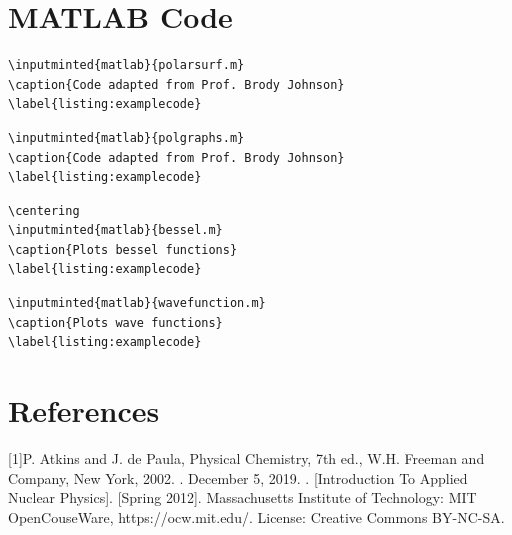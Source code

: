 \documentclass{article}
\begin{document}
\section{MATLAB Code}
\begin{lstlisting}[h]
\inputminted{matlab}{polarsurf.m}
\caption{Code adapted from Prof. Brody Johnson}
\label{listing:examplecode}
\end{lstlisting}

\begin{lstlisting}[h]
\inputminted{matlab}{polgraphs.m}
\caption{Code adapted from Prof. Brody Johnson}
\label{listing:examplecode}
\end{lstlisting}

\begin{lstlisting}[frame=sing]
\centering
\inputminted{matlab}{bessel.m}
\caption{Plots bessel functions}
\label{listing:examplecode}
\end{lstlisting}

\begin{lstlisting}[h]
\inputminted{matlab}{wavefunction.m}
\caption{Plots wave functions}
\label{listing:examplecode}
\end{lstlisting}

\clearpage
\section{References}

[1]P. Atkins and J. de Paula, Physical Chemistry, 7th ed., W.H. Freeman and Company, New York,
2002.
. December 5, 2019. 
. [Introduction To Applied Nuclear Physics]. [Spring 2012]. Massachusetts Institute of Technology: MIT OpenCouseWare, https://ocw.mit.edu/. License: Creative Commons BY-NC-SA.
\end{document}
